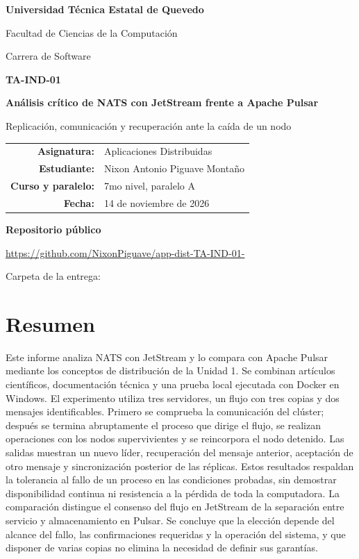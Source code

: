 \documentclass[11pt,a4paper]{article}
\newcommand{\archivo}[1]{\texttt{\detokenize{#1}}}
\begin{document}
\begin{titlepage}
\centering
{\Large\bfseries Universidad Técnica Estatal de Quevedo\par}
\vspace{0.35cm}
{\large Facultad de Ciencias de la Computación\par}
{\large Carrera de Software\par}
\vspace{2cm}
{\Large\bfseries TA-IND-01\par}
\vspace{0.5cm}
{\LARGE\bfseries Análisis crítico de NATS con JetStream frente a Apache Pulsar\par}
\vspace{0.7cm}
{\large Replicación, comunicación y recuperación ante la caída de un nodo\par}
\vspace{1.7cm}
\begin{tabular}{rl}
\textbf{Asignatura:} & Aplicaciones Distribuidas\\[6pt]
\textbf{Estudiante:} & Nixon Antonio Piguave Montaño\\[6pt]
\textbf{Curso y paralelo:} & 7mo nivel, paralelo A\\[6pt]
\textbf{Fecha:} & 14 de noviembre de 2026
\end{tabular}
\vfill
\textbf{Repositorio público}\par
\small\url{https://github.com/NixonPiguave/app-dist-TA-IND-01-}\par
\vspace{0.2cm}
Carpeta de la entrega: \archivo{nixon/}
\end{titlepage}

\section*{Resumen}
Este informe analiza NATS con JetStream y lo compara con Apache Pulsar mediante los conceptos de distribución de la Unidad 1. Se combinan artículos científicos, documentación técnica y una prueba local ejecutada con Docker en Windows. El experimento utiliza tres servidores, un flujo con tres copias y dos mensajes identificables. Primero se comprueba la comunicación del clúster; después se termina abruptamente el proceso que dirige el flujo, se realizan operaciones con los nodos supervivientes y se reincorpora el nodo detenido. Las salidas muestran un nuevo líder, recuperación del mensaje anterior, aceptación de otro mensaje y sincronización posterior de las réplicas. Estos resultados respaldan la tolerancia al fallo de un proceso en las condiciones probadas, sin demostrar disponibilidad continua ni resistencia a la pérdida de toda la computadora. La comparación distingue el consenso del flujo en JetStream de la separación entre servicio y almacenamiento en Pulsar. Se concluye que la elección depende del alcance del fallo, las confirmaciones requeridas y la operación del sistema, y que disponer de varias copias no elimina la necesidad de definir sus garantías.
\end{document}
